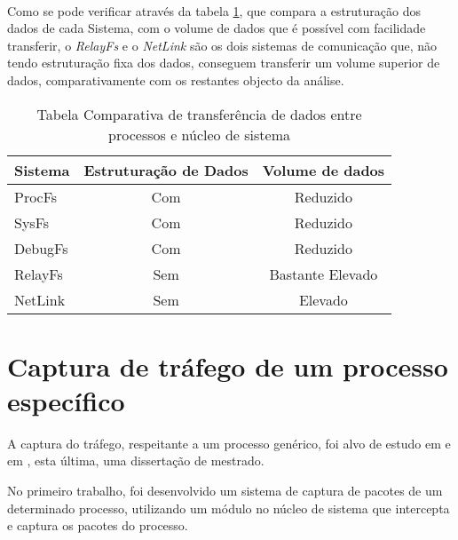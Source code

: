 \paragraph*{}
Como se pode verificar através da tabela \ref{tab:transf_compare}, que compara a estruturação dos dados de cada Sistema, com o volume de dados que é possível com facilidade transferir, o \textit{RelayFs} e o \textit{NetLink} são os dois sistemas de comunicação que, não tendo estruturação fixa dos dados, conseguem transferir um volume superior de dados, comparativamente com os restantes objecto da análise.

\begin{table}[!htbp]
\begin{center}
\caption{Tabela Comparativa de transferência de dados entre processos e núcleo de sistema}
\begin{tabular}{|l||c|c|}
\hline
Sistema & Estruturação de Dados & Volume de dados \\
\hline
ProcFs & Com & Reduzido \\
\hline
SysFs & Com & Reduzido \\
\hline
DebugFs & Com & Reduzido \\
\hline
RelayFs & Sem & Bastante Elevado \\
\hline
NetLink & Sem & Elevado \\
\hline
\end{tabular}

\label{tab:transf_compare}
\end{center}
\end{table}
 
\section{Captura de tráfego de um processo específico}
\label{sect:outras_abordagens}

A captura do tráfego, respeitante a um processo genérico, foi alvo de estudo em \cite{1688981} e em \cite{duarte10,Farruca:2009}, esta última, uma dissertação de mestrado.

No primeiro trabalho, foi desenvolvido um sistema de captura de pacotes de um determinado processo, utilizando um módulo no núcleo de sistema que intercepta e captura os pacotes do processo.

